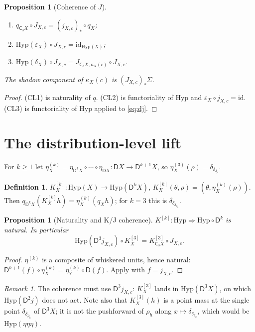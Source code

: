\documentclass[11pt]{article}
\newtheorem{proposition}[theorem]{Proposition}
\theoremstyle{definition}
\newtheorem{definition}[theorem]{Definition}
\theoremstyle{remark}
\newtheorem{remark}[theorem]{Remark}
\newcommand{\D}{\mathsf{D}}
\newcommand{\Hyp}{\mathrm{Hyp}}
\newcommand{\C}{\mathsf{C}}
\newcommand{\id}{\mathrm{id}}
\begin{document}
\begin{proposition}[Coherence of $J$]\label{prop:CL}
\begin{enumerate}[label=(CL\arabic*)]
\item $q_{\C_3X}\circ J_{X,c}=(j_{X,c})_*\circ q_X$;
\item $\Hyp(\varepsilon_X)\circ J_{X,c}=\id_{\Hyp(X)}$;
\item $\Hyp(\delta_X)\circ J_{X,c}=J_{\C_3X,\kappa_X(c)}\circ J_{X,c}$.
\end{enumerate}
The shadow component of $\kappa_X(c)$ is $(J_{X,c})_*\Sigma$.
\end{proposition}
\begin{proof}
(CL1) is naturality of $q$. (CL2) is functoriality of $\Hyp$ and
$\varepsilon_X\circ j_{X,c}=\id$. (CL3) is functoriality of $\Hyp$ applied to \eqref{eq:dj}.
\end{proof}

\section{The distribution-level lift}

For $k\ge1$ let $\eta^{(k)}_X=\eta_{\D^kX}\circ\cdots\circ\eta_{\D X}\colon\D X\to\D^{k+1}X$, so
$\eta^{(3)}_X(\rho)=\delta_{\delta_{\delta_\rho}}$.

\begin{definition}
$K^{[k]}_X\colon\Hyp(X)\to\Hyp(\D^kX)$, $K^{[k]}_X(\theta,\rho)=(\theta,\eta^{(k)}_X(\rho))$. Then
$q_{\D^kX}(K^{[k]}_Xh)=\eta^{(k)}_X(q_Xh)$; for $k=3$ this is $\delta_{\delta_{\delta_{\rho_h}}}$.
\end{definition}

\begin{proposition}[Naturality and K/J coherence]\label{prop:K}
$K^{[k]}\colon\Hyp\Rightarrow\Hyp\circ\D^k$ is natural. In particular
\[
\Hyp(\D^3j_{X,c})\circ K^{[3]}_X=K^{[3]}_{\C_3X}\circ J_{X,c}.
\]
\end{proposition}
\begin{proof}
$\eta^{(k)}$ is a composite of whiskered units, hence natural:
$\D^{k+1}(f)\circ\eta^{(k)}_X=\eta^{(k)}_Y\circ\D(f)$. Apply with $f=j_{X,c}$.
\end{proof}

\begin{remark}
The coherence must use $\D^3j_{X,c}$: $K^{[3]}_X$ lands in $\Hyp(\D^3X)$, on which $\Hyp(\D^2j)$ does
not act. Note also that $K^{[3]}_X(h)$ is a point mass at the single point $\delta_{\delta_{\rho_h}}$ of
$\D^3X$; it is not the pushforward of $\rho_h$ along $x\mapsto\delta_{\delta_{\delta_x}}$, which would
be $\Hyp(\eta\eta\eta)$.
\end{remark}
\end{document}
